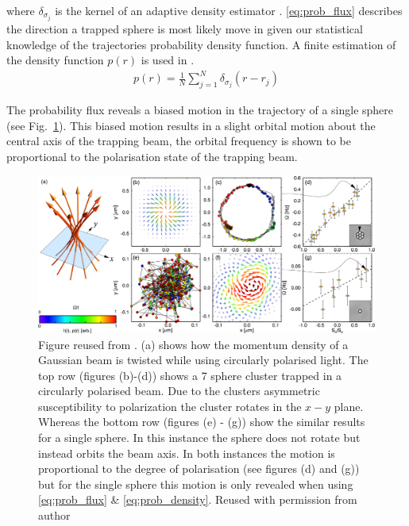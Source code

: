 where $\delta_{\sigma_j}$ is the kernel of an adaptive density estimator
\cite{Silverman1986}. \eqref{eq:prob_flux} describes the direction a trapped
sphere is most likely move in given our statistical knowledge of the 
trajectories probability density function. A finite estimation of the density
function $p(r)$ is used in \cite{Ruffner2012}.
\begin{align}
	p(r) = \frac{1}{N}\sum_{j=1}^N \delta_{\sigma_j}(r-r_j)
	\label{eq:prob_density}
\end{align}

The probability flux reveals a biased motion in the trajectory of a single 
sphere (see Fig.~\ref{fig:Ruffner_Grier}). This biased motion results in a
slight orbital motion about the central axis of the trapping beam, the orbital
frequency is shown to be proportional to the polarisation state of the trapping
beam. 
\begin{figure}[h!]
	\centering
	\includegraphics[width=\linewidth]{Ruffner_Grier_2012.pdf}
	\caption{Figure reused from \cite{Ruffner2012}. (a) shows how the momentum 
		density of a Gaussian beam is twisted while using circularly polarised 
		light. The top row (figures (b)-(d)) shows a 7 sphere cluster trapped 
		in a circularly polarised beam. Due to the clusters asymmetric 
		susceptibility to polarization the cluster rotates in the $x-y$ plane.   Whereas the bottom row (figures (e) - (g)) show the similar results for a single sphere. In this instance the sphere does not rotate but instead 
		orbits the beam axis. In both instances the motion is proportional to 
		the degree of polarisation (see figures (d) and (g)) but for the single
		sphere this motion is only revealed when using \eqref{eq:prob_flux} \& \eqref{eq:prob_density}. Reused with permission from author}
	\label{fig:Ruffner_Grier}
\end{figure}

